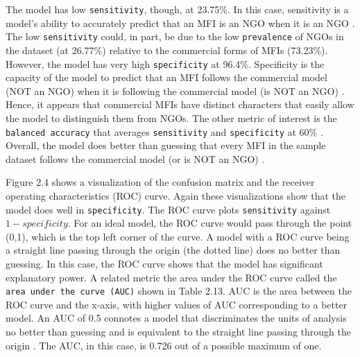 \documentclass[a4paper, nobind]{templates/ociamthesis}
\begin{document}
The model has low \texttt{sensitivity}, though, at 23.75\%. In this case, sensitivity is a model's ability to accurately predict that an MFI is an NGO when it is an NGO \autocite{marom2010using}. The low \texttt{sensitivity} could, in part, be due to the low \texttt{prevalence} of NGOs in the dataset (at 26.77\%) relative to the commercial forms of MFIs (73.23\%). However, the model has very high \texttt{specificity} at 96.4\%. Specificity is the capacity of the model to predict that an MFI follows the commercial model (NOT an NGO) when it is following the commercial model (is NOT an NGO) \autocite{zeng2020confusion}. Hence, it appears that commercial MFIs have distinct characters that easily allow the model to distinguish them from NGOs. The other metric of interest is the \texttt{balanced\ accuracy} that averages \texttt{sensitivity} and \texttt{specificity} at 60\% \autocite{gorzalczany2016multi}. Overall, the model does better than guessing that every MFI in the sample dataset follows the commercial model (or is NOT an NGO) \autocite{hosmer2013applied}.

Figure 2.4 shows a visualization of the confusion matrix and the receiver operating characteristics (ROC) curve. Again these visualizations show that the model does well in \texttt{specificity}. The ROC curve plots \texttt{sensitivity} against \(1 - specificity\). For an ideal model, the ROC curve would pass through the point (0,1), which is the top left corner of the curve. A model with a ROC curve being a straight line passing through the origin (the dotted line) does no better than guessing. In this case, the ROC curve shows that the model has significant explanatory power. A related metric the area under the ROC curve called the \texttt{area\ under\ the\ curve\ (AUC)} shown in Table 2.13. AUC is the area between the ROC curve and the x-axis, with higher values of AUC corresponding to a better model. An AUC of 0.5 connotes a model that discriminates the units of analysis no better than guessing and is equivalent to the straight line passing through the origin \autocite{mandrekar2010receiver}. The AUC, in this case, is 0.726 out of a possible maximum of one.
\end{document}

